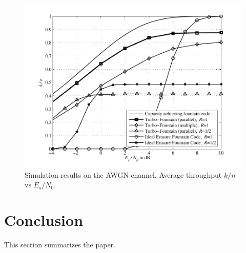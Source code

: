 \documentclass[journal, a4paper]{IEEEtran}
\begin{document}

	\begin{figure}[!hbt]
		\begin{center}
		\includegraphics[width=\columnwidth]{plot_tf}
		\caption{Simulation results on the AWGN channel. Average throughput $k/n$ vs $E_s/N_0$.}
		\label{fig:tf_plot}
		\end{center}
	\end{figure}

\section{Conclusion}
	This section summarizes the paper.
\end{document}
